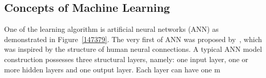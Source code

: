 \subsection{Concepts of Machine Learning}
One of the learning algorithm is artificial neural networks (ANN) as demonstrated in Figure~\ref{147379}. The very first of ANN was proposed by~\citet{McCulloch_1943}, which was inspired by the structure of human neural connections. A typical ANN model construction possesses three structural layers, namely: one input layer, one or more hidden layers and one output layer. Each layer can have one m